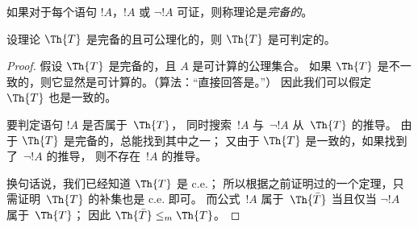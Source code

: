 \documentclass[../../../include/open-logic-section]{subfiles}
\begin{document}


如果对于每个语句 $!A$，$!A$ 或 $\lnot !A$ 可证，则称理论是{\em 完备的}。

\begin{lem}
设理论 $\Th{T}$ 是完备的且可公理化的，则 $\Th{T}$ 是可判定的。
\end{lem}

\begin{proof}
假设 $\Th{T}$ 是完备的，且 $A$ 是可计算的公理集合。
如果 $\Th{T}$ 是不一致的，则它显然是可计算的。（算法：“直接回答是。”）
因此我们可以假定 $\Th{T}$ 也是一致的。

要判定语句 $!A$ 是否属于~$\Th{T}$，
同时搜索~$!A$ 与~$\lnot !A$ 从~$\Th{T}$ 的推导。
由于 $\Th{T}$ 是完备的，总能找到其中之一；
又由于 $\Th{T}$ 是一致的，如果找到了~$\lnot !A$ 的推导，
则不存在~$!A$ 的推导。

换句话说，我们已经知道 $\Th{T}$ 是 c.e.；
所以根据之前证明过的一个定理，只需证明~$\Th{T}$ 的补集也是 c.e. 即可。
而公式~$!A$ 属于~$\Th{\bar T}$ 当且仅当 $\lnot !A$ 属于~$\Th{T}$；
因此 $\Th{\bar T} \leq_m
\Th{T}$。
\end{proof}
\end{document}
